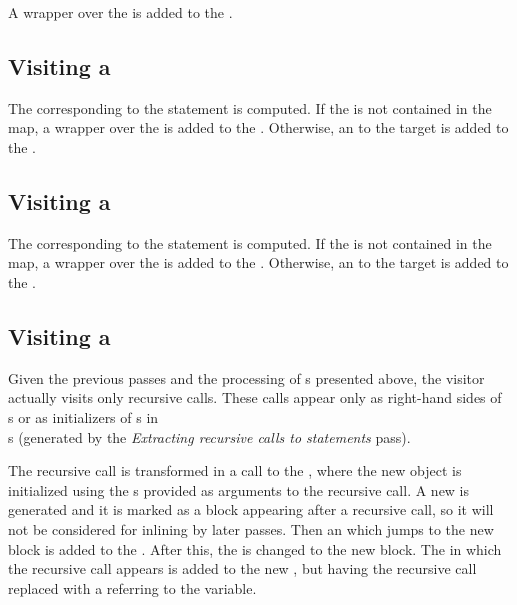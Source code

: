 A  wrapper over the  is added to the .

\subsection{Visiting a }

The  corresponding to the  statement is computed. If the  is
not contained in the  map, a  wrapper over the  is
added to the . Otherwise, an  to the target  is added
to the .

\subsection{Visiting a }

The  corresponding to the  statement is computed. If the 
is not contained in the  map, a  wrapper over the 
is added to the . Otherwise, an  to the target  is added
to the .

\subsection{Visiting a }

Given the previous passes and the processing of s presented above, the visitor actually visits only
recursive calls. These calls appear only as right-hand sides of\\
s or as initializers of s in\\
s (generated by the \textit{Extracting recursive calls to statements} pass).

The recursive call is transformed in a  call to the , where the new  object is
initialized using the s provided as arguments to the recursive call. A new  is generated
and it is marked as a block appearing after a recursive call, so it will not be considered for inlining by later passes.
Then an  which jumps to the new block is added to the . After this,
the  is changed to the new block. The  in which the recursive call appears is
added to the new , but having the recursive call replaced with a  referring to
the  variable.

